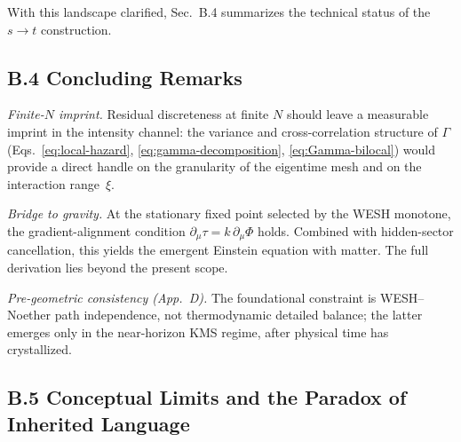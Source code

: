 \documentclass[12pt,a4paper]{article}
\numberwithin{equation}{section}
\begin{document}
\vspace{0.5cm}

\noindent With this landscape clarified, Sec.~B.4 summarizes the technical status of the $s \to t$ construction.

\vspace{0.8cm}

\subsection*{B.4 Concluding Remarks}
\vspace{0.5cm}

\noindent\textit{Finite-$N$ imprint.}
Residual discreteness at finite $N$ should leave a measurable imprint in the intensity channel: the variance and cross-correlation structure of $\Gamma$ (Eqs.~\eqref{eq:local-hazard}, \eqref{eq:gamma-decomposition}, 
\eqref{eq:Gamma-bilocal}) would provide a direct handle on the granularity of the eigentime mesh and on the interaction range~$\xi$.

\smallskip
\noindent\textit{Bridge to gravity.}
At the stationary fixed point selected by the WESH monotone, the gradient-alignment condition $\partial_\mu\tau = k\,\partial_\mu\Phi$ holds. Combined with hidden-sector cancellation, this yields the emergent Einstein equation with matter. The full derivation lies beyond the present scope.

\smallskip
\noindent\textit{Pre-geometric consistency (App.~D).}
The foundational constraint is WESH--Noether path independence, not thermodynamic detailed balance; the latter emerges only in the near-horizon KMS regime, after physical time has crystallized.

\vspace{0.8cm}

\subsection*{B.5 Conceptual Limits and the Paradox of Inherited Language}
\end{document}
